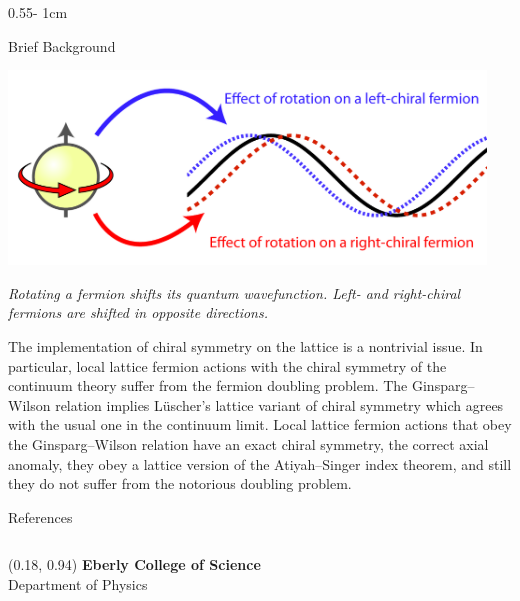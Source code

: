 \documentclass{../psuposter}
\begin{document}
\begin{frame}
\begin{columns}[t, totalwidth=\textwidth]
\begin{column}{0.55\textwidth - 1cm}
\begin{block}{Brief Background}
        \begin{center}
		   	\includegraphics[width=0.95\textwidth]{images/background}    		
		
		\textit{Rotating a fermion shifts its quantum wavefunction. Left- and right-chiral fermions are shifted in opposite directions. \cite{cokerChiralsymmetry}}
    	\end{center}
    	
    	The implementation of chiral symmetry on the lattice is a nontrivial issue. In particular, local lattice fermion actions with the chiral symmetry of the continuum theory suffer from the fermion doubling problem. The Ginsparg–Wilson relation implies Lüscher’s lattice variant of chiral symmetry which agrees with the usual one in the continuum limit. Local lattice fermion actions that obey the Ginsparg–Wilson relation have an exact chiral symmetry, the correct axial anomaly, they obey a lattice version of the Atiyah–Singer index theorem, and still they do not suffer from the notorious doubling problem. \cite{chandrasekharanIntroductionChiralSymmetry2004}
    	
    \end{block}


    \begin{block}{References}
        
%        
		
    \end{block}

\end{column}
\end{columns}


\begin{textblock}{0.5}(0.18, 0.94)
    \color{white}
    \sffamily
    \textbf{Eberly College of Science}
    \\
    Department of Physics
\end{textblock}


\end{frame}
\end{document}
